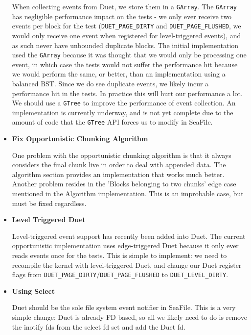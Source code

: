 \documentclass[table]{article}
\newcommand{\code}[1]{\texttt{#1}}
\begin{document}
\begin{multicols}{2}
\begin{itemize}
        When collecting events from Duet, we store them in a \code{GArray}. The \code{GArray} has negligible performance impact on the tests - we only ever receive two events per block for the test (\code{DUET\_PAGE\_DIRTY} and \code{DUET\_PAGE\_FLUSHED}, we would only receive one event when registered for level-triggered events), and as such never have unbounded duplicate blocks. The initial implementation used the \code{GArray} because it was thought that we would only be processing one event, in which case the tests would not suffer the performance hit because we would perform the same, or better, than an implementation using a balanced BST. Since we do see duplicate events, we likely incur a performance hit in the tests. In practice this will hurt our performance a lot. We should use a \code{GTree} to improve the performance of event collection. An implementation is currently underway, and is not yet complete due to the amount of code that the \code{GTree} API forces us to modify in SeaFile.
        
    \item \textbf{Fix Opportunistic Chunking Algorithm}
    
        One problem with the opportunistic chunking algorithm is that it always considers the final chunk live in order to deal with appended data. The algorithm section provides an implementation that works much better. Another problem resides in the 'Blocks belonging to two chunks' edge case mentioned in the Algorithm implementation. This is an improbable case, but must be fixed regardless.
        
    \item \textbf{Level Triggered Duet}
    
        Level-triggered event support has recently been added into Duet. The current opportunistic implementation uses edge-triggered Duet because it only ever reads events once for the tests. This is simple to implement: we need to recompile the kernel with level-triggered Duet, and change our Duet register flags from \code{DUET\_PAGE\_DIRTY}/\code{DUET\_PAGE\_FLUSHED} to \code{DUET\_LEVEL\_DIRTY}.
        
    \item \textbf{Using Select}
    
        Duet should be the sole file system event notifier in SeaFile. This is a very simple change: Duet is already FD based, so all we likely need to do is remove the inotify fds from the select fd set and add the Duet fd.
        

\end{itemize}
\end{multicols}
\end{document}
